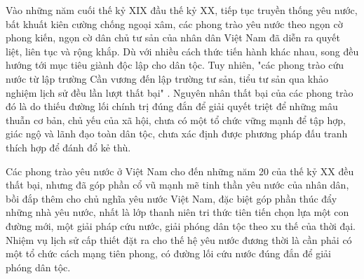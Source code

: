 Vào những năm cuối thế kỷ XIX đầu thế kỷ XX, tiếp tục truyền thống yêu nước, bất khuất kiên cường chống ngoại xâm, các phong trào yêu nước theo ngọn cờ phong kiến, ngọn cờ dân chủ tư sản của nhân dân Việt Nam đã diễn ra quyết liệt, liên tục và rộng khắp. Dù với nhiều cách thức tiến hành khác nhau, song đều hướng tới mục tiêu giành độc lập cho dân tộc. Tuy nhiên, "các phong trào cứu nước từ lập trường Cần vương đến lập trường tư sản, tiểu tư sản qua khảo nghiệm lịch sử đều lần lượt thất bại" . Nguyên nhân thất bại của các phong trào đó là do thiếu đường lối chính trị đúng đắn để giải quyết triệt để những mâu thuẫn cơ bản, chủ yếu của xã hội, chưa có một tổ chức vững mạnh để tập hợp, giác ngộ và lãnh đạo toàn dân tộc, chưa xác định được phương pháp đấu tranh thích hợp để đánh đổ kẻ thù.

Các phong trào yêu nước ở Việt Nam cho đến những năm 20 của thế kỷ XX đều thất bại, nhưng đã góp phần cổ vũ mạnh mẽ tinh thần yêu nước của nhân dân, bồi đắp thêm cho chủ nghĩa yêu nước Việt Nam, đặc biệt góp phần thúc đẩy những nhà yêu nước, nhất là lớp thanh niên tri thức tiên tiến chọn lựa một con đường mới, một giải pháp cứu nước, giải phóng dân tộc theo xu thế của thời đại. Nhiệm vụ lịch sử cấp thiết đặt ra cho thế hệ yêu nước đương thời là cần phải có một tổ chức cách mạng tiên phong, có đường lối cứu nước đúng đắn để giải phóng dân tộc.